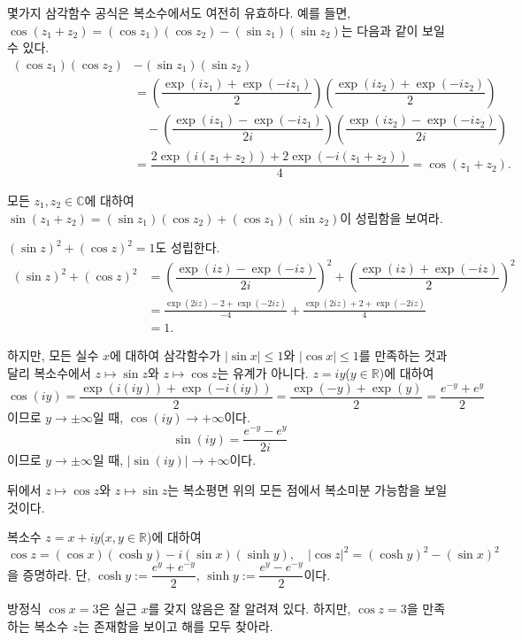 몇가지 삼각함수 공식은 복소수에서도 여전히 유효하다.
예를 들면, $\cos(z_1+z_2) = (\cos z_1)(\cos z_2) - (\sin z_1)(\sin z_2)$는 
다음과 같이 보일 수 있다.
\begin{align*}
(\cos z_1)(\cos z_2) &- (\sin z_1)(\sin z_2)  \\
&= \left( \dfrac{\exp(iz_1)+\exp(-iz_1)}2\right)
\left( \dfrac{\exp(iz_2)+\exp(-iz_2)}2\right) \\
& \quad - \left( \dfrac{\exp(iz_1)-\exp(-iz_1)}{2i}\right)
\left( \dfrac{\exp(iz_2)-\exp(-iz_2)}{2i}\right) \\
&= \dfrac{2\exp(i(z_1+z_2)) + 2\exp(-i(z_1+z_2))}{4} 
= \cos(z_1+z_2).
\end{align*}

\begin{salt_exercise} \label{ex-1-36}
모든 $z_1, z_2 \in \mathbb C$에 대하여
$\sin(z_1+z_2) = (\sin z_1)(\cos z_2) + (\cos z_1)(\sin z_2)$이 성립함을 보여라.
\end{salt_exercise}

$(\sin z)^2 + (\cos z)^2 = 1$도 성립한다.
\begin{align*}
(\sin z)^2 + (\cos z)^2 
&=  \left(\dfrac{\exp(iz)-\exp(-iz)}{2i}\right)^2
+ \left(\dfrac{\exp(iz)+\exp(-iz)}{2}\right)^2 \\
&= \frac{\exp(2iz) - 2 + \exp(-2iz)}{-4}
+ \frac{\exp(2iz) + 2 + \exp(-2iz)}4 \\
&=1.
\end{align*}

하지만, 모든 실수 $x$에 대하여 삼각함수가 
$|\sin x| \le 1$와 $|\cos x|\le 1$를 만족하는 것과 달리
복소수에서 
$z\mapsto \sin z$와 $z\mapsto \cos z$는 유계가 아니다.
$z=iy$($y\in\mathbb R$)에 대하여
$$
\cos (iy) = \frac{\exp(i(iy))+\exp(-i(iy))}2
= \frac{\exp(-y) + \exp(y)}2 = \frac{e^{-y}+e^y}2
$$
이므로
$y\to \pm \infty$일 때, $\cos(iy) \to +\infty$이다.
$$
\sin(iy) = \frac{e^{-y}-e^y}{2i}
$$
이므로 
$y\to \pm \infty$일 때, $|\sin(iy)| \to +\infty$이다.

뒤에서 $z\mapsto \cos z$와 $z\mapsto \sin z$는 
복소평면 위의 모든 점에서 복소미분 가능함을 보일 것이다.


\begin{salt_exercise} \label{ex-1-37}
복소수 $z=x+iy$($x,y\in\mathbb R$)에 대하여
$$
\cos z = (\cos x)(\cosh y) - i(\sin x)(\sinh y), \quad
|\cos z|^2 = (\cosh y)^2 - (\sin x)^2
$$
을 증명하라. 단, $\cosh y := \dfrac{e^y+e^{-y}}2$, 
$\sinh y := \dfrac{e^y-e^{-y}}2$이다.
\end{salt_exercise}

\begin{salt_exercise} \label{ex-1-38}
방정식 $\cos x = 3$은 실근 $x$를 갖지 않음은 잘 알려져 있다.
하지만, $\cos z=3$을 만족하는 복소수 $z$는 존재함을 보이고
해를 모두 찾아라.
\end{salt_exercise}

